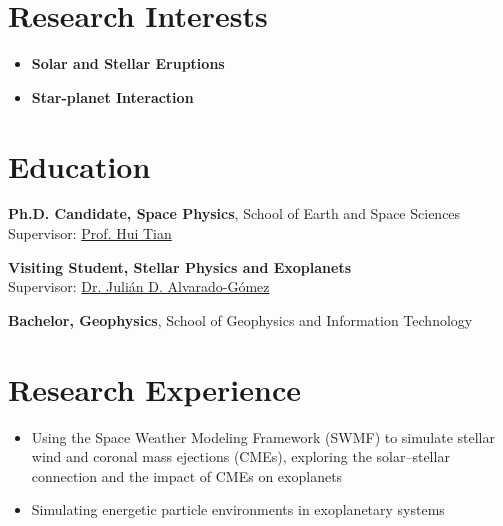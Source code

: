 \documentclass{resume}
\begin{document}




\section{Research Interests}
\begin{itemize}
\item \textbf{Solar and Stellar Eruptions}
\item \textbf{Star-planet Interaction}
\end{itemize}

\section{Education}
\textbf{Ph.D. Candidate, Space Physics}, School of Earth and Space Sciences
\\Supervisor: \href{https://scholar.google.com/citations?user=uoTD4VUAAAAJ&hl=zh-CN&oi=ao}{ Prof. Hui Tian }

\textbf{Visiting Student, Stellar Physics and Exoplanets}
\\Supervisor: \href{https://pages.aip.de/jalvarado/}{ Dr. Julián D. Alvarado-Gómez }




\textbf{Bachelor, Geophysics}, School of Geophysics and Information Technology


\section{Research Experience}

\begin{itemize}
\item Using the Space Weather Modeling Framework (SWMF) to simulate stellar wind and coronal mass ejections (CMEs), exploring the solar--stellar connection and the impact of CMEs on exoplanets
\item Simulating energetic particle environments in exoplanetary systems
\end{itemize}
\end{document}
